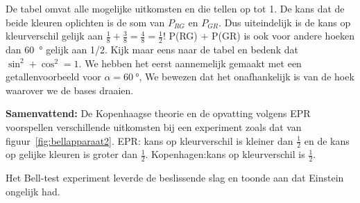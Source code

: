 \documentclass[../../main.tex]{subfiles}
\begin{document}
De tabel omvat alle mogelijke uitkomsten en die tellen op tot 1. De kans dat de beide kleuren oplichten is de som van $P_{RG}$ en $P_{GR}$. Dus uiteindelijk is de kans op kleurverschil gelijk aan $\tfrac{1}{8}+\tfrac{3}{8}=\tfrac{4}{8}=\tfrac{1}{2}$!  P(RG) + P(GR) is ook voor andere hoeken dan \SI{60}{\degree} gelijk aan 1/2. Kijk maar eens naar de tabel en bedenk dat $\sin^2 + \cos^2 = 1$. We hebben het eerst aannemelijk gemaakt met een getallenvoorbeeld voor $\alpha=\SI{60}{\degree}$, We bewezen dat het onafhankelijk is van de hoek waarover we de bases draaien. 

\textbf{Samenvattend:} De Kopenhaagse theorie en de opvatting volgens EPR voorspellen verschillende uitkomsten bij een experiment zoals dat van figuur~\ref{fig:bellapparaat2}. EPR: kans op kleurverschil is kleiner dan $\tfrac{1}{2}$ en de kans op gelijke kleuren is groter dan $\tfrac{1}{2}$. Kopenhagen:kans op kleurverschil is $\tfrac{1}{2}$.

Het Bell-test experiment leverde de beslissende slag en toonde aan dat Einstein ongelijk had. 
\end{document}
